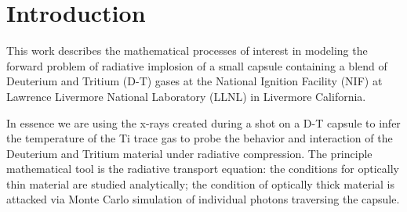 \chapter{Introduction}

This work describes the mathematical processes of interest in modeling the forward problem of radiative implosion of a small capsule containing a blend of Deuterium and Tritium (D-T) gases at the National Ignition Facility (NIF) at Lawrence Livermore National Laboratory (LLNL) in Livermore California.

In essence we are using the x-rays created during a shot on a D-T capsule to infer the temperature of the Ti trace gas to probe the behavior and interaction of the Deuterium and Tritium material under radiative compression. The principle mathematical tool is the radiative transport equation: the conditions for optically thin material are studied analytically; the \cite[MS]{Trent1981} condition of optically thick material is attacked via Monte Carlo simulation of individual \cite{Stefanov2009} photons traversing the capsule.\cite[p. 10]{chandra1960}






\endinput